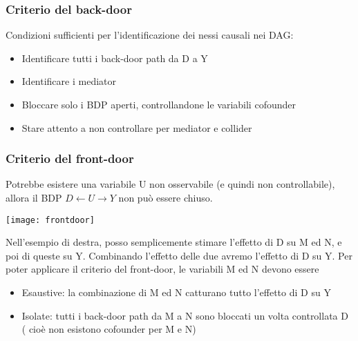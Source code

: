 \subsubsection{Criterio del back-door}
Condizioni sufficienti per l'identificazione dei nessi causali nei DAG:
\begin{itemize}
    \item Identificare tutti i back-door path da D a Y
    \item Identificare i mediator
    \item Bloccare solo i BDP aperti, controllandone le variabili cofounder
    \item Stare attento a non controllare per mediator e collider
\end{itemize}
\subsubsection{Criterio del front-door}
Potrebbe esistere una variabile U non osservabile (e quindi non controllabile), allora il 
BDP $D \leftarrow U \to Y$ non può essere chiuso.
\begin{marginfigure}
    \texttt{[image: frontdoor]}
\end{marginfigure}
Nell'esempio di destra, posso semplicemente stimare l'effetto di D su M ed N, e poi di queste 
su Y. Combinando l'effetto delle due avremo l'effetto di D su Y. Per poter applicare il 
criterio del front-door, le variabili M ed N devono essere 
\begin{itemize}
    \item Esaustive: la combinazione di M ed N catturano tutto l'effetto di D su Y
    \item Isolate: tutti i back-door path da M a N sono bloccati un volta controllata D (
        cioè non esistono cofounder per M e N)
\end{itemize}
